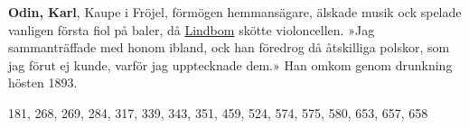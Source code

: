 \textbf{Odin, Karl}, Kaupe i Fröjel, förmögen hemmansägare, älskade musik ock spelade vanligen första fiol på baler, då \href{Lindbom}{Lindbom} skötte violoncellen. »Jag sammanträffade med honom ibland, ock han föredrog då åtskilliga polskor, som jag förut ej kunde, varför jag upptecknade dem.» Han omkom genom drunkning hösten 1893. 

181, 268, 269, 284, 317, 339, 343, 351, 459, 524, 574, 575, 580, 653, 657, 658 
